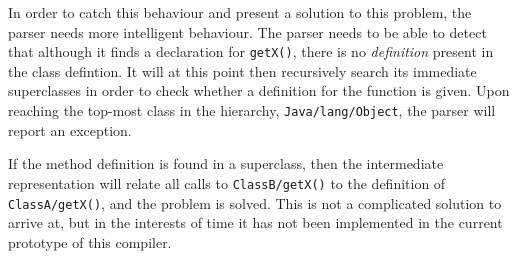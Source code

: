 In order to catch this behaviour and present a solution to this problem, the parser needs more intelligent behaviour. The parser needs to be able to detect that although it finds a declaration for \verb|getX()|, there is no \emph{definition} present in the class defintion. It will at this point then recursively search its immediate superclasses in order to check whether a definition for the function is given. Upon reaching the top-most class in the hierarchy, \verb|Java/lang/Object|, the parser will report an exception.

If the method definition is found in a superclass, then the intermediate representation will relate all calls to \verb|ClassB/getX()| to the definition of \verb|ClassA/getX()|, and the problem is solved. This is not a complicated solution to arrive at, but in the interests of time it has not been implemented in the current prototype of this compiler.
